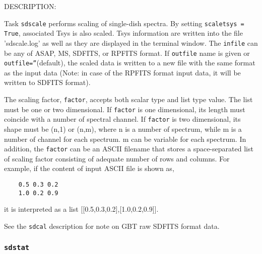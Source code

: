 DESCRIPTION:

Task {\tt sdscale} performs scaling of single-dish spectra.
By setting {\tt scaletsys = True}, associated Tsys is also scaled.
Tsys information are written into the file 'sdscale.log'
as well as they are displayed in the terminal window.
The {\tt infile} can be any of ASAP, MS, SDFITS, or RPFITS format.
If {\tt outfile} name is given or {\tt outfile=''}(default), the scaled data is written
to a new file with the same format as the input data (Note: in case of the
RPFITS format input data, it will be written to SDFITS format).
    
The scaling factor, {\tt factor}, accepts both scalar type and list type
value. The list must be one or two dimensional. If {\tt factor} is one
dimensional, its length must coincide with a number of spectral
channel. If {\tt factor} is two dimensional, its shape must be (n,1) or
(n,m), where n is a number of spectrum, while m is a number of channel
for each spectrum. m can be variable for each spectrum. In addition,
the {\tt factor} can be an ASCII filename that stores a space-separated list
of scaling factor consisting of adequate number of rows and columns.
For example, if the content of input ASCII file is shown as,

\begin{verbatim}
    0.5 0.3 0.2
    1.0 0.2 0.9
\end{verbatim}

it is interpreted as a list [[0.5,0.3,0.2],[1.0,0.2,0.9]].

See the {\tt sdcal} description for note on GBT raw SDFITS format data.

\subsubsection{{\tt sdstat}}
\label{section:sd.sdtasks.tasks.sdstat}


